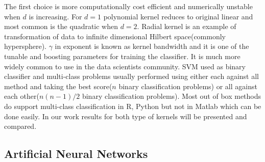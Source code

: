 The first choice is more computationally cost efficient and numerically unstable when $d$ is increasing. For $d=1$ polynomial kernel reduces to original linear and most common is the quadratic when $d=2$. Radial kernel is an example of transformation of data to infinite dimensional Hilbert space(commonly hypersphere). $\gamma$ in exponent is known as kernel bandwidth and it is one of the tunable and boosting parameters for training the classifier. It is much more widely common to use in the data scientists community. SVM used as binary classifier and multi-class problems usually performed using either each against all method and taking the best score($n$ binary classification problems) or all against each other($n(n-1)/2$ binary classification problems). Most out of box methods do support multi-class classification in R, Python but not in Matlab which can be done easily.  In our work results for both type of kernels will be presented and compared.           
\clearpage
\subsection{Artificial Neural Networks}

